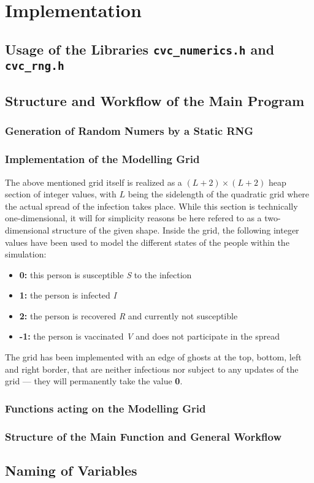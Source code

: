 \section{Implementation}

\subsection{Usage of the Libraries \texttt{cvc\_numerics.h} and \texttt{cvc\_rng.h}}

\subsection{Structure and Workflow of the Main Program}

\subsubsection*{Generation of Random Numers by a Static RNG}

\subsubsection*{Implementation of the Modelling Grid}

The above mentioned grid itself is realized as a $\left(L+2\right)\times \left(L+2\right)$ heap section of integer values, with $L$ being the sidelength of the quadratic grid where the actual spread of the infection takes place.
While this section is technically one-dimensional, it will for simplicity reasons be here refered to as a two-dimensional structure of the given shape. Inside the grid, the following integer values have been used 
to model the different states of the people within the simulation:
\begin{itemize}
    \item \textbf{0:} this person is susceptible \textit{S} to the infection
    \item \textbf{1:} the person is infected \textit{I}
    \item \textbf{2:} the person is recovered \textit{R} and currently not susceptible
    \item \textbf{-1:} the person is vaccinated \textit{V} and does not participate in the spread
\end{itemize}
The grid has been implemented with an edge of ghosts at the top, bottom, left and right border, that are neither infectious nor subject to any updates of the grid --- they will permanently take the value \textbf{0}.

\subsubsection*{Functions acting on the Modelling Grid}

\subsubsection*{Structure of the Main Function and General Workflow}

\subsection{Naming of Variables}